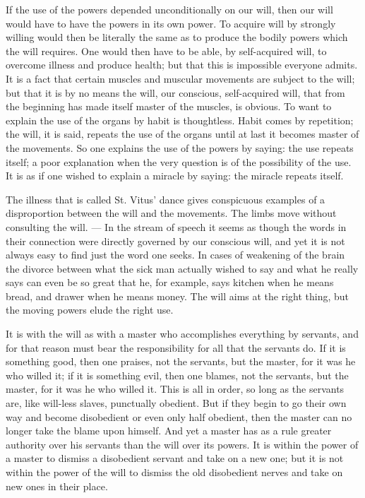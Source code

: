 \documentclass[12pt,a4paper,openany]{book}
\newcommand{\opage}[1]{\marginnote{\footnotesize\textit{[#1]}}}
\begin{document}
If the use of the powers depended unconditionally on our
will, then our will would have to have the powers in its
own power. To acquire will by strongly willing would then
be literally the same as to produce the bodily
powers which the will requires. One would then have to be able, by
self-acquired will, to overcome illness and produce
\setcounter{footnote}{0}%
\opage{6}health; but that this is impossible everyone admits. It
is a fact that certain muscles and muscular movements
are subject to the will; but that it is by no means the will,
our conscious, self-acquired will, that from the beginning
has made itself master of the muscles, is obvious.
To want to explain the use of the organs by habit is thoughtless.
Habit comes by repetition; the will, it is said, repeats
the use of the organs until at last it
becomes master of the movements. So one explains the use
of the powers by saying: the use repeats itself; a poor
explanation when the very question is of the possibility of the use.
It is as if one wished to explain a miracle
by saying: the miracle repeats itself.

The illness that is called St. Vitus' dance gives
conspicuous examples of a disproportion between the will and
the movements. The limbs move without consulting
the will. --- In the stream of speech it seems as though the words in
their connection were directly governed by our conscious
will, and yet it is not always easy to find just the word
one seeks. In cases of weakening of the brain the divorce
between what the sick man actually wished to say and what
he really says can even be so great that he, for example,
says kitchen when he means bread, and drawer when he
means money. The will aims at the right thing, but the moving
powers elude the right use.

It is with the will as with a master who accomplishes
everything by servants, and for that reason must bear the responsibility
for all that the servants do. If it is something good, then
one praises, not the servants, but the master, for it was he
who willed it; if it is something evil, then one blames, not
the servants, but the master, for it was he who willed it.
This is all in order, so long as the servants are,
like will-less slaves, punctually obedient. But if they begin
to go their own way and become disobedient or even
only half obedient, then the master can no longer take the blame
upon himself. And yet a master has as a rule greater authority
over his servants than the will over its powers.
It
\setcounter{footnote}{0}%
\opage{7}is within the power of a master to dismiss a disobedient servant
and take on a new one; but it is not within the power of the will to dismiss the old disobedient nerves and take on
new ones in their place.
\end{document}
